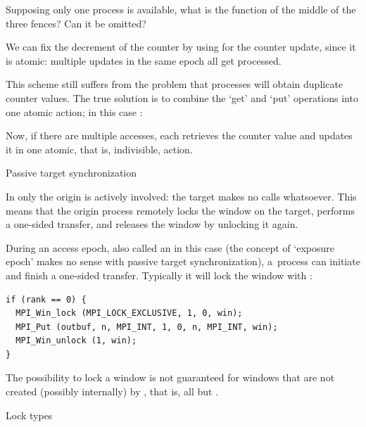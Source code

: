 \begin{exercise}
  Supposing only one process is available, what is the function
  of the middle of the three fences? Can it be omitted?
\end{exercise}

We can fix the decrement of the counter by using 
for the counter update, since it is atomic:
multiple updates in the same epoch all get processed.
%

This scheme still suffers from the problem that processes will obtain duplicate
counter values. The true solution is to combine the `get' and `put' operations
into one atomic action; in this case :
%

Now, if there are multiple accesses, each retrieves the counter value
and updates it in one atomic, that is, indivisible, action.


 {Passive target synchronization}
\label{sec:passive-sync}

In  only the origin is
actively involved: the target makes no calls whatsoever.
This means that the origin process remotely locks the window
on the target, performs a one-sided transfer, and releases the window
by unlocking it again.

During an access epoch, also called an
 in this case
(the concept of `exposure epoch' makes no sense with passive target synchronization),
a~process can initiate and finish a one-sided
transfer. Typically it will lock the window with
:

\begin{lstlisting}
if (rank == 0) {
  MPI_Win_lock (MPI_LOCK_EXCLUSIVE, 1, 0, win);
  MPI_Put (outbuf, n, MPI_INT, 1, 0, n, MPI_INT, win);
  MPI_Win_unlock (1, win);
}
\end{lstlisting}

\begin{remark}
  The possibility to lock a window is not guaranteed for windows
  that are not created (possibly internally) by ,
  that is, all but .
\end{remark}

 {Lock types}

